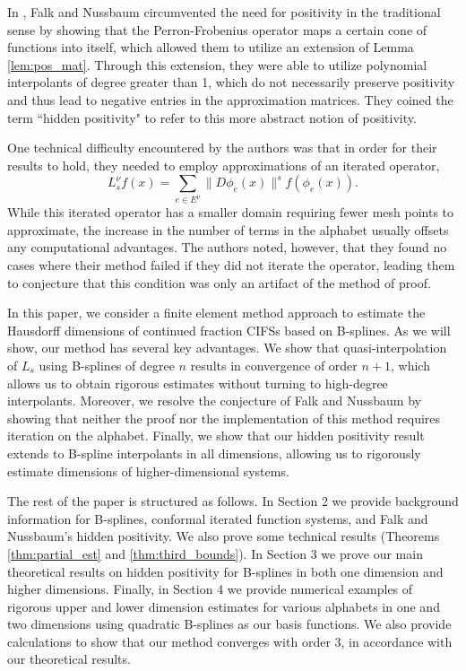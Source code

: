 \documentclass[10pt]{article}
\theoremstyle{definition}
\numberwithin{equation}{section}
\numberwithin{figure}{section}
\numberwithin{table}{section}
\begin{document}
In \cite{falk2021hidden}, Falk and Nussbaum circumvented the need for positivity in the traditional sense by showing that the Perron-Frobenius operator maps a certain cone of functions into itself, which allowed them to utilize an extension of Lemma \ref{lem:pos_mat}. Through this extension, they were able to utilize polynomial interpolants of degree greater than 1, which do not necessarily preserve positivity and thus lead to negative entries in the approximation matrices. They coined the term ``hidden positivity" to refer to this more abstract notion of positivity.

One technical difficulty encountered by the authors was that in order for their results to hold, they needed to employ approximations of an iterated operator,
$$L^\nu_sf(x)=\sum_{e\in E^\nu}\|D\phi_e(x)\|^sf(\phi_e(x)).$$
While this iterated operator has a smaller domain requiring fewer mesh points to approximate, the increase in the number of terms in the alphabet usually offsets any computational advantages. The authors noted, however, that they found no cases where their method failed if they did not iterate the operator, leading them to conjecture that this condition was only an artifact of the method of proof.

In this paper, we consider a finite element method approach to estimate the Hausdorff dimensions of continued fraction CIFSs based on B-splines. As we will show, our method has several key advantages. We show that quasi-interpolation of $L_s$ using B-splines of degree $n$ results in convergence of order $n+1$, which allows us to obtain rigorous estimates without turning to high-degree interpolants. Moreover, we resolve the conjecture of Falk and Nussbaum by showing that neither the proof nor the implementation of this method requires iteration on the alphabet. Finally, we show that our hidden positivity result extends to B-spline interpolants in all dimensions, allowing us to rigorously estimate dimensions of higher-dimensional systems.

The rest of the paper is structured as follows. In Section 2 we provide background information for B-splines, conformal iterated function systems, and Falk and Nussbaum's hidden positivity. We also prove some technical results (Theorems \ref{thm:partial_est} and \ref{thm:third_bounds}). In Section 3 we prove our main theoretical results on hidden positivity for B-splines in both one dimension and higher dimensions. Finally, in Section 4 we provide numerical examples of rigorous upper and lower dimension estimates for various alphabets in one and two dimensions using quadratic B-splines as our basis functions. We also provide calculations to show that our method converges with order 3, in accordance with our theoretical results.
\end{document}
